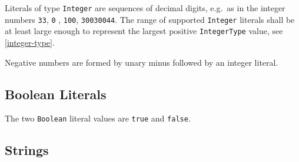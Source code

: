 Literals of type \lstinline!Integer! are sequences of decimal digits, e.g.\ as in the integer numbers \lstinline!33!,
\ifpdf
\lstinline!0!%
%
\fi
, \lstinline!100!, \lstinline!30030044!.
The range of supported \lstinline!Integer! literals shall be at least large enough to represent the largest positive \lstinline!IntegerType! value, see \cref{integer-type}.

\begin{nonnormative}
Negative numbers are formed by unary minus followed by an integer literal.
\end{nonnormative}

\subsection{Boolean Literals}\label{boolean-literals}

The two \lstinline!Boolean! literal values are \lstinline!true! and \lstinline!false!.

\subsection{Strings}\label{strings}

